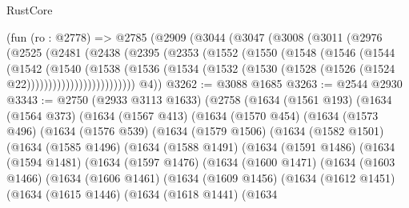 \begin{lexlean}{RustCore}
\begin{coremodule}
    (fun (ro : @2778) =>
    @2785
      (@2909
        (@3044
          (@3047
            (@3008
              (@3011
                (@2976
                  (@2525
                    (@2481
                      (@2438
                        (@2395
                          (@2353
                            (@1552
                              (@1550
                                (@1548
                                  (@1546
                                    (@1544
                                      (@1542
                                        (@1540
                                          (@1538
                                            (@1536
                                              (@1534
                                                (@1532
                                                  (@1530
                                                    (@1528
                                                      (@1526 (@1524 @22)))))))))))))))))))))))))
        @4))
@3262 := @3088 @1685
@3263 := @2544 @2930
@3343 := @2750
    (@2933 @3113 @1633)
    (@2758
      (@1634
        (@1561 @193)
        (@1634
          (@1564 @373)
          (@1634
            (@1567 @413)
            (@1634
              (@1570 @454)
              (@1634
                (@1573 @496)
                (@1634
                  (@1576 @539)
                  (@1634
                    (@1579 @1506)
                    (@1634
                      (@1582 @1501)
                      (@1634
                        (@1585 @1496)
                        (@1634
                          (@1588 @1491)
                          (@1634
                            (@1591 @1486)
                            (@1634
                              (@1594 @1481)
                              (@1634
                                (@1597 @1476)
                                (@1634
                                  (@1600 @1471)
                                  (@1634
                                    (@1603 @1466)
                                    (@1634
                                      (@1606 @1461)
                                      (@1634
                                        (@1609 @1456)
                                        (@1634
                                          (@1612 @1451)
                                          (@1634
                                            (@1615 @1446)
                                            (@1634
                                              (@1618 @1441)
                                              (@1634

\end{coremodule}
\end{lexlean}

